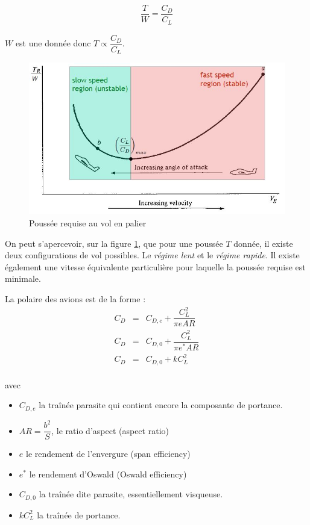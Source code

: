 \documentclass{report}
\begin{document}
\begin{eqnarray}
\dfrac{T}{W}=\dfrac{C_D}{C_L}
\end{eqnarray}

$W$ est une donnée donc $T\propto\dfrac{C_D}{C_L}$.

\begin{figure}[h!]
    \centering
    \includegraphics[scale=0.7]{5.JPG}
    \caption{Poussée requise au vol en palier}
    \label{5}
\end{figure}

On peut s'apercevoir, sur la figure \ref{5}, que pour une poussée $T$ donnée, il existe deux configurations de vol possibles. Le \textit{régime lent} et le \textit{régime rapide}. Il existe également une vitesse équivalente particulière pour laquelle la poussée requise est minimale.

La polaire des avions est de la forme :
\begin{eqnarray}
C_D &= &C_{D,e}+\dfrac{C_L^2}{\pi e AR}\\
C_D &= &C_{D,0}+\dfrac{C_L^2}{\pi e^* AR}\\
C_D &= &C_{D,0}+kC_L^2\\
\end{eqnarray}

avec 
\begin{itemize}
    \item $C_{D,e}$ la traînée parasite qui contient encore la composante de portance.
    \item $AR=\dfrac{b^2}{S}$, le ratio d'aspect (aspect ratio)
    \item $e$ le rendement de l'envergure (span efficiency)
    \item $e^*$ le rendement d'Oswald (Oswald efficiency)
    \item $C_{D,0}$ la traînée dite parasite, essentiellement visqueuse. 
    \item $kC_L^2$ la traînée de portance.
\end{itemize}
\end{document}
